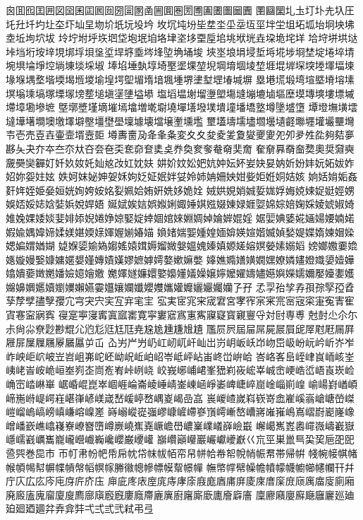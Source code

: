 囪囬囮囯囲図囶囷囸囻囼圀圁圂圅圌圎圏圐圑圔圕圗圙圚
圛圝圞圠圡圢圤圥圦圧圫圱圲圴圵圶圷圸圼圽圿坁坃坄坅
坆坈坉坋坒坓坔坕坖坘坙坢坣坥坧坬坮坰坱坲坴坵坸坹坺
坽坾坿垀垁垇垈垉垊垍垎垏垐垑垔垕垖垗垘垙垚垜垝垞垟
垥垨垪垬垯垰垱垳垵垶垷垹垺垻垼垽垾垿埀埁埄埅埆埇埈
埉埊埌埍埐埑埓埖埗埛埜埞埢埣埥埦埧埨埩埪埫埬埮埰埱
埲埳埵埶埻埼埾埿堁堃堄堈堉堌堎堏堐堒堓堔堗堘堚堛堜
堟堢堣堥堦堧堨堩堫堬堭堮堲堳堶堷堸堹堺堻堼堽堾堿塀
塁塂塃塅塆塇塈塉塎塐塓塕塖塙塚塛塜塝塟塠塡塣塦塧塨
塩塪塭塮塯塰塱塲塳塴塶塷塸塺塻塼塽塿墂墄墆墇墈墋墌
墍墎墏墐墑墔墕墖増墘墛墝墠墡墢墣墤墥墦墧墪墫墬墭墯
墰墱墲墴墵墶墷墸墹墺墽墿壀壂壃壄壆壈壉壊壋壌壍壎壏
壐壒壔壖壗壛壜壝壡壣壥壦壧壨壪壭壱売壴壵壷壸壻壼壾
壿夀夁夃夅夆夈変⼢夊夋夌夎夐夑夒夓夗夘夛夝夞夠夡夣
夦夨夬夰夲夳夵夶夻夽夿奀奃奅奆奊奌奍奐奒奓奙奛奜奝
奞奟奡奣奤奦奧奨奫奭奯奰奱奲奵奷奺奻奼奾奿妀妅妉妋
妌妎妏妐妑妔妕妘妚妛妜妟妠妡妢妦妧妬妭妰妱妳妴妵妶
妷妸妺妼妽妿姀姁姂姃姄姅姇姈姉姌姍姎姏姕姖姙姛姞姟
姠姡姢姤姦姧姩姪姫姭姮姯姰姱姲姳姴姵姶姷姸姺姼姽姾
娀娂娊娋娍娎娏娐娒娔娕娖娗娙娚娛娝娞娡娢娤娦娧娨娪
娫娬娭娮娯娰娳娵娷娸娹娺娻娽娾娿婂婃婄婅婇婈婋婌婍
婎婏婐婑婒婓婔婖婗婘婙婛婜婝婞婟婠婡婣婤婥婨婩婫婬
婮婯婰婱婲婳婸婹婻婼婽婾媀媁媂媃媄媅媆媇媈媉媊媋媌
媍媎媏媐媑媓媔媕媖媗媘媙媜媝媞媟媠媡媢媣媤媥媦媨媩
媫媬媭媮媯媰媱媴媶媷媹媺媻媼媿嫀嫃嫄嫅嫆嫇嫈嫊嫋嫍
嫎嫏嫐嫑嫓嫕嫙嫚嫛嫝嫞嫟嫢嫤嫥嫧嫨嫪嫬嫭嫮嫯嫰嫲嫳
嫴嫶嫷嫸嫹嫺嫼嫽嫾嫿嬁嬂嬃嬄嬅嬆嬇嬊嬍嬎嬏嬐嬑嬒嬓
嬔嬕嬘嬚嬛嬜嬝嬞嬟嬠嬢嬣嬤嬥嬦嬧嬨嬩嬫嬬嬭嬮嬯嬱嬳
嬵嬶嬹嬺嬻嬼嬽嬾嬿孁孂孃孄孅孆孇孈孉孊孋孍孎孏孒孖
孞孠孡孧孨孭孮孯孲孴孶孷孹孻孼孾宂宆宊宍宎宐宑宒宔
宖実宧宨宩宬宭宮宯宱宲宷宺宻宼寀寁寃寈寉寊寋寍寎寏
寑寔寕寖寗寘寙寚寛寜寠寣寪寭寯寱寲寳寴寷寽対尀専尃
尅尌尐尒尓尗尙尛尞尟尠尡尣尦尨尩尪尫尭尮尯尰尲尳尵
尶屃屄屆屇屌屍屒屓屔屖屗屘屚屛屜屝屟屧屩屪屫屭屰屲
屳屴屵屶屷屸屻屼屽屾岀岃岄岅岆岇岉岊岋岎岏岒岓岕岝
岞岟岠岤岥岦岧岨岪岮岯岰岲岴岶岹岺岻岼岾峀峂峃峅峆
峇峈峉峊峌峍峎峏峐峑峓峔峕峖峗峘峚峛峜峝峞峟峠峢峣
峧峩峫峬峮峯峱峲峳峵峷峸峹峺峼峾峿崀崁崄崅崈崉崊崋
崌崏崐崑崒崓崕崘崙崚崜崝崟崠崡崢崣崥崨崪崫崯崰崱崲
崳崵崶崷崸崹崺崻崼崿嵀嵁嵂嵃嵄嵅嵆嵈嵉嵍嵎嵏嵑嵒嵓
嵔嵕嵖嵗嵙嵚嵜嵞嵟嵠嵡嵢嵣嵤嵥嵦嵧嵨嵪嵭嵮嵰嵱嵲嵳
嵵嵶嵷嵸嵹嵺嵻嵼嵽嵾嵿嶀嶃嶅嶆嶈嶉嶊嶋嶌嶍嶎嶏嶐嶑
嶒嶓嶔嶕嶖嶘嶚嶛嶜嶞嶟嶡嶢嶣嶤嶥嶦嶨嶩嶪嶫嶬嶭嶮嶯
嶰嶱嶲嶳嶴嶵嶶嶹嶻嶽嶾嶿巀巁巂巃巄巆巇巈巉巊巌巎巏
巐巑巓巕巖巗巘巙巚巜巟巠巣巤巪巬巭巵巶巸巹巺巻巼巿
帀帄帇帉帊帋帍帎帒帓帗帞帟帠帡帢帣帤帨帩帪帬帯帰帲
帴帵帹帺帾帿幁幆幇幈幉幊幋幍幎幏幐幑幒幓幖幙幚幜幝
幠幤幥幦幧幨幩幪幭幮幯幰幱幵幷庁庂広庅庈庉庌庍庎庒
庘庛庝庡庢庣庤庨庩庪庬庮庯庰庱庲庴庺庻庼庽庿廀廁廂
廃廄廅廆廇廈廋廌廍廎廏廐廔廕廗廘廙廚廜廝廞廤廥廦廧
廩廫廭廮廯廰廱廲廵廸廹廻廼廽弅弆弇弉弌弍弎弐弒弔弖
